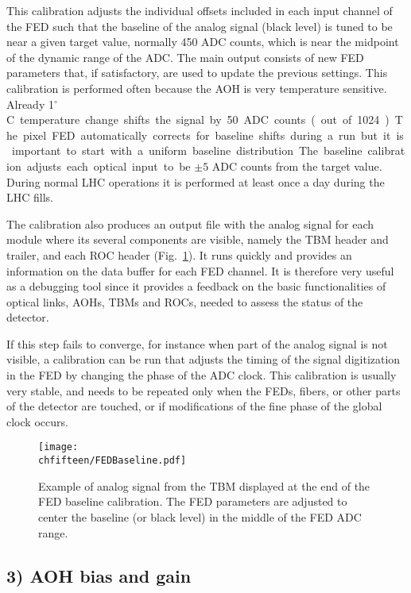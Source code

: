 This calibration adjusts the individual offsets included in each input channel of the FED such that the baseline of the analog signal (black level) is tuned to be near a given target value, normally 450 ADC counts, which is near the midpoint of the dynamic range of the ADC. The main output consists of new FED parameters that, if satisfactory, are used to update the previous settings.
This calibration is performed often because the AOH is very temperature sensitive. Already 1\unit{$^\circ$C} temperature change shifts the signal by 50 ADC counts (out of 1024).
The pixel FED automatically corrects for baseline shifts during a run but it is important to start with a uniform baseline distribution.
The baseline calibration adjusts each optical input to be $\pm5$ ADC counts from the target value. During normal LHC operations it is performed at least once a day during the LHC fills.

The calibration also produces an output file with the analog signal for each module where its several components are visible, namely the TBM header and trailer, and each ROC header (Fig.~\ref{fig:FEDBaseline}).
It runs quickly and provides an information on the data buffer for each FED channel. It is therefore very useful as a debugging tool since it provides a feedback on the basic functionalities of optical links, AOHs, TBMs and ROCs, needed to assess the status of the detector.

If this step fails to converge, for instance when part of the analog signal is not visible, a calibration can be run that adjusts the timing of the signal digitization in the FED by changing the phase of the ADC clock.
This calibration is usually very stable, and needs to be repeated only when the FEDs, fibers, or other parts of the detector are touched, or if modifications of the fine phase of the global clock occurs.

\begin{figure}[!htb]
 \begin{center}
 \texttt{[image: \\chfifteen/FEDBaseline.pdf]}
 \end{center}
 \caption{Example of analog signal from the TBM displayed at the end of the FED baseline calibration. The FED parameters are adjusted to center the baseline (or black level) in the middle of the FED ADC range.}
 \label{fig:FEDBaseline}
\end{figure}

\subsection*{3) AOH bias and gain}

